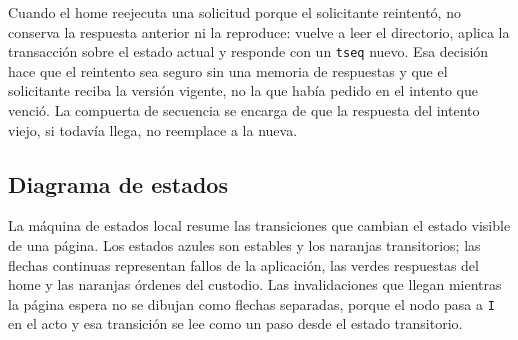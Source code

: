 Cuando el home reejecuta una solicitud porque el solicitante reintentó, no conserva la respuesta anterior ni la reproduce: vuelve a leer el directorio, aplica la transacción sobre el estado actual y responde con un \texttt{tseq} nuevo. Esa decisión hace que el reintento sea seguro sin una memoria de respuestas y que el solicitante reciba la versión vigente, no la que había pedido en el intento que venció. La compuerta de secuencia se encarga de que la respuesta del intento viejo, si todavía llega, no reemplace a la nueva.

\subsection{Diagrama de estados}\label{sec:msi-diagrama}

La máquina de estados local resume las transiciones que cambian el estado visible de una página. Los estados azules son estables y los naranjas transitorios; las flechas continuas representan fallos de la aplicación, las verdes respuestas del home y las naranjas órdenes del custodio. Las invalidaciones que llegan mientras la página espera no se dibujan como flechas separadas, porque el nodo pasa a \texttt{I} en el acto y esa transición se lee como un paso desde el estado transitorio.

